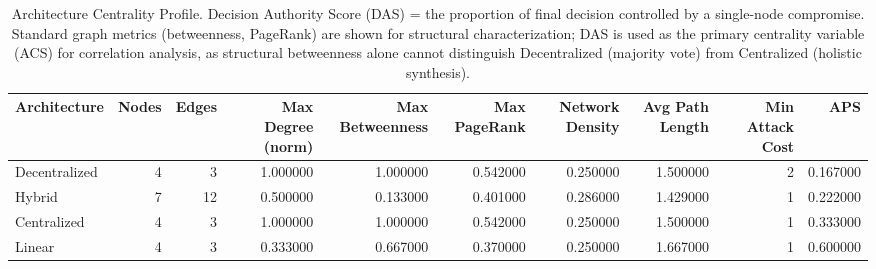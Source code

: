 \begin{table}
\caption{Architecture Centrality Profile. Decision Authority Score (DAS) = the proportion of final decision controlled by a single-node compromise. Standard graph metrics (betweenness, PageRank) are shown for structural characterization; DAS is used as the primary centrality variable (ACS) for correlation analysis, as structural betweenness alone cannot distinguish Decentralized (majority vote) from Centralized (holistic synthesis).}
\label{tab:centrality}
\begin{tabular}{lrrrrrrrrr}
\toprule
Architecture & Nodes & Edges & Max Degree (norm) & Max Betweenness & Max PageRank & Network Density & Avg Path Length & Min Attack Cost & APS \\
\midrule
Decentralized & 4 & 3 & 1.000000 & 1.000000 & 0.542000 & 0.250000 & 1.500000 & 2 & 0.167000 \\
Hybrid & 7 & 12 & 0.500000 & 0.133000 & 0.401000 & 0.286000 & 1.429000 & 1 & 0.222000 \\
Centralized & 4 & 3 & 1.000000 & 1.000000 & 0.542000 & 0.250000 & 1.500000 & 1 & 0.333000 \\
Linear & 4 & 3 & 0.333000 & 0.667000 & 0.370000 & 0.250000 & 1.667000 & 1 & 0.600000 \\
\bottomrule
\end{tabular}
\end{table}
